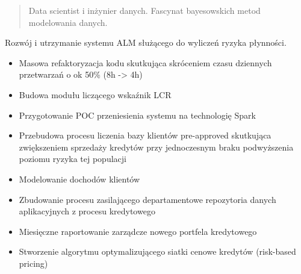 \documentclass[10pt,a4paper,ragged2e,withhyper]{altacv}
\begin{document}
\tagline{}


\makecvheader



\begin{paracol}{1}

    \begin{quote}
        Data scientist i inżynier danych. Fascynat bayesowskich metod modelowania danych.
    \end{quote}

    Rozwój i utrzymanie systemu ALM służącego do wyliczeń ryzyka płynności.\break

    \begin{itemize}
        \item Masowa refaktoryzacja kodu skutkująca skróceniem czasu dziennych przetwarzań o ok 50\% (8h -> 4h)
        \item Budowa modułu liczącego wskaźnik LCR
        \item Przygotowanie POC przeniesienia systemu na technologię Spark
    \end{itemize}
    \divider

    \begin{itemize}
        \item Przebudowa procesu liczenia bazy klientów pre-approved skutkująca zwiększeniem sprzedaży kredytów przy jednoczesnym braku podwyższenia poziomu ryzyka tej populacji
        \item Modelowanie dochodów klientów
    \end{itemize}
    \divider

    \begin{itemize}
        \item Zbudowanie procesu zasilającego departamentowe repozytoria danych aplikacyjnych z procesu kredytowego
        \item Miesięczne raportowanie zarządcze nowego portfela kredytowego
        \item Stworzenie algorytmu optymalizującego siatki cenowe kredytów (risk-based pricing)
    \end{itemize}
    \divider


\end{paracol}
\end{document}

